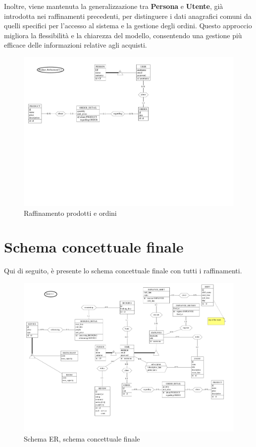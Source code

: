 \documentclass[a4paper,12pt]{report}
\begin{document}
\vspace{\baselineskip}
Inoltre, viene mantenuta la generalizzazione tra \textbf{Persona} e
\textbf{Utente}, già introdotta nei raffinamenti precedenti, per
distinguere i dati anagrafici comuni da quelli specifici per
l'accesso al sistema e la gestione degli ordini. Questo approccio
migliora la flessibilità e la chiarezza del modello, consentendo una
gestione più efficace delle informazioni relative agli acquisti.

\begin{figure}[H]
  \centering
  \includegraphics[width=\textwidth, trim=0 300pt 325pt 0,
  clip]{./schemas/refinements/product.pdf}
  \caption{Raffinamento prodotti e ordini}
  \label{fig:raffinamento-prodotto-ordini}
\end{figure}

\newpage
\section{Schema concettuale finale}
Qui di seguito, è presente lo schema concettuale finale con tutti i
raffinamenti.

\begin{figure}[H]
  \centering
  \includegraphics[width=\textwidth, trim=0 0 0
  0]{./schemas/er-final.pdf}
  \caption{Schema ER, schema concettuale finale}
  \label{fig:schema-finale}
\end{figure}
\end{document}
